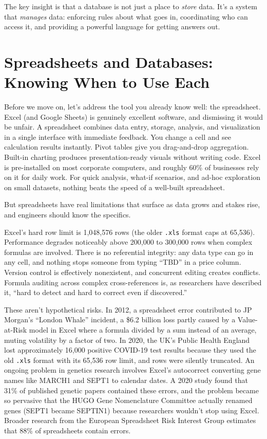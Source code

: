\documentclass[
  letterpaper,
  DIV=11,
  numbers=noendperiod]{scrreprt}
\begin{document}
The key insight is that a database is not just a place to \emph{store}
data. It's a system that \emph{manages} data: enforcing rules about what
goes in, coordinating who can access it, and providing a powerful
language for getting answers out.

\section{Spreadsheets and Databases: Knowing When to Use
Each}\label{spreadsheets-and-databases-knowing-when-to-use-each}

Before we move on, let's address the tool you already know well: the
spreadsheet. Excel (and Google Sheets) is genuinely excellent software,
and dismissing it would be unfair. A spreadsheet combines data entry,
storage, analysis, and visualization in a single interface with
immediate feedback. You change a cell and see calculation results
instantly. Pivot tables give you drag-and-drop aggregation. Built-in
charting produces presentation-ready visuals without writing code. Excel
is pre-installed on most corporate computers, and roughly 60\% of
businesses rely on it for daily work. For quick analysis, what-if
scenarios, and ad-hoc exploration on small datasets, nothing beats the
speed of a well-built spreadsheet.

But spreadsheets have real limitations that surface as data grows and
stakes rise, and engineers should know the specifics.

Excel's hard row limit is 1,048,576 rows (the older \texttt{.xls} format
caps at 65,536). Performance degrades noticeably above 200,000 to
300,000 rows when complex formulas are involved. There is no referential
integrity: any data type can go in any cell, and nothing stops someone
from typing ``TBD'' in a price column. Version control is effectively
nonexistent, and concurrent editing creates conflicts. Formula auditing
across complex cross-references is, as researchers have described it,
``hard to detect and hard to correct even if discovered.''

These aren't hypothetical risks. In 2012, a spreadsheet error
contributed to JP Morgan's ``London Whale'' incident, a \$6.2 billion
loss partly caused by a Value-at-Risk model in Excel where a formula
divided by a sum instead of an average, muting volatility by a factor of
two. In 2020, the UK's Public Health England lost approximately 16,000
positive COVID-19 test results because they used the old \texttt{.xls}
format with its 65,536 row limit, and rows were silently truncated. An
ongoing problem in genetics research involves Excel's autocorrect
converting gene names like MARCH1 and SEPT1 to calendar dates. A 2020
study found that 31\% of published genetic papers contained these
errors, and the problem became so pervasive that the HUGO Gene
Nomenclature Committee actually renamed genes (SEPT1 became SEPTIN1)
because researchers wouldn't stop using Excel. Broader research from the
European Spreadsheet Risk Interest Group estimates that 88\% of
spreadsheets contain errors.
\end{document}
